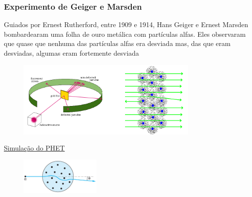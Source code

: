 \documentclass[12pt,brazil]{beamer}
\begin{document}
\begin{frame}
  \frametitle{Experimento de Geiger e Marsden}

  \begin{multicols}{2}
    \begin{minipage}[b][20ex][t]{\linewidth}
    \vspace*{0.5cm}
        \fontsize{9pt}{11pt}\selectfont
      
        Guiados por Ernest Rutherford, entre 1909 e 1914, Hans Geiger e Ernest Marsden  bombardearam uma folha de ouro metálica com partículas alfas. Eles observaram que quase que nenhuma das partículas alfas era desviada mas, das que eram desviadas, algumas eram fortemente desviada
      
    \end{minipage}

    \begin{minipage}[b][20ex][t]{\linewidth}
    \vspace*{-1.cm}
      \begin{figure}
        \hspace*{1.5cm}\includegraphics[width=9cm]{figuras/fig05}
      \end{figure}
  
    \vspace*{-0.5cm}
      \fontsize{5pt}{11pt}\selectfont
      \href{https://phet.colorado.edu/sims/html/rutherford-scattering/latest/rutherford-scattering_all.html}{\color{blue} Simulação do PHET}
    \end{minipage}

    \begin{minipage}[b][40ex][t]{\linewidth}
    \vspace*{0.50cm}
      \begin{figure}
        \includegraphics[width=4cm]{figuras/fig06}
      \end{figure}
    \end{minipage}
  \end{multicols}
  
\end{frame}
\end{document}
